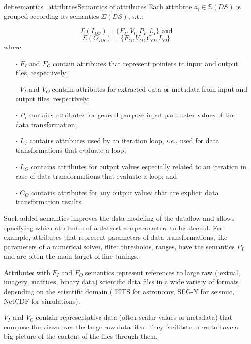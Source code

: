 \begin{mydef}{def:semantics_attributes}{Semantics of attributes}
Each attribute $a_i \in \mathbb{S}(DS)$ is grouped according its semantics
$\Sigma(DS)$, s.t.:

$$\Sigma(I_{DS}) = \{F_I, V_I, P_I, L_I\} \text{ and} $$
$$\Sigma(O_{DS}) = \{F_O, V_O, C_O, L_O\}$$
where:
\begin{itemize}
\setlength\itemsep{-2mm}
\item[-] \noindent
  $F_I$ and $F_O$ contain attributes that represent pointers to
  input and output files, respectively;
\item[-] \noindent
  $V_I$ and $V_O$ contain attributes for extracted
  data or metadata from input and output files, respectively;
\item[-] \noindent
  $P_I$ contains attributes for general purpose input parameter
  values of the data transformation;
\item[-] \noindent
  $L_I$ contains attributes used by an iteration loop, \emph{i.e.},
  used for data transformations that evaluate a loop;
\item[-] \noindent
  $L_O$ contains attributes for output values especially related to an iteration
  in case of data transformations that evaluate a loop; and
\item[-] \noindent
  $C_O$ contains attributes for any output values that are explicit
  data transformation results.
\end{itemize}

\end{mydef}

Such added semantics improves the data modeling of the dataflow and
allows specifying which attributes of a dataset are parameters to
be steered. For example, attributes that represent parameters of data transformations, like
parameters of a numerical solver, filter thresholds, ranges, have the semantics $P_I$ and are often the main target of fine tunings.

Attributes with $F_I$ and $F_O$ semantics represent references to large raw (textual, imagery, matrices,
binary data) scientific data files in a wide variety of formats
depending on the scientific domain (\eg{} FITS for astronomy,
SEG-Y for seismic, NetCDF for  simulations).

$V_I$ and $V_O$ contain representative data (often scalar values or metadata) that compose the views over the large raw data files. They facilitate users to have a big picture of the content of
the files through them.

